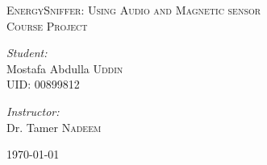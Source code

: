 \begin{titlepage}

\begin{center}
\vspace*{2in}
\textsc{\LARGE EnergySniffer:  Using Audio and Magnetic sensor}\\[1.5cm]
\textsc{\Large Course Project}\\[0.5cm]

\vspace*{2in}
\begin{minipage}{0.4\textwidth}
\begin{flushleft} \large
\emph{Student:}\\
Mostafa Abdulla \textsc{Uddin}\\
UID: 00899812\\
\end{flushleft}
\end{minipage}
\begin{minipage}{0.4\textwidth}
\begin{flushright} \large
\emph{Instructor:} \\
Dr. Tamer \textsc{Nadeem}
\end{flushright}
\end{minipage}


\vfill

{\large \today}
\end{center}

\end{titlepage}